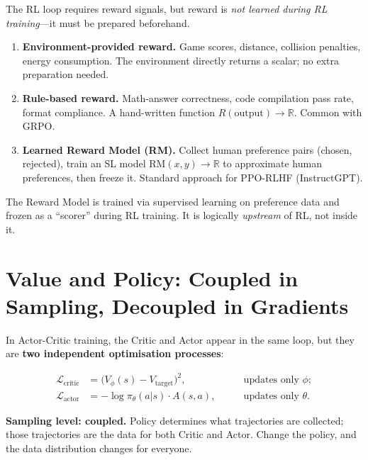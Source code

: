 The RL loop requires reward signals, but reward is \emph{not learned during RL training}---it must be prepared beforehand.

\begin{enumerate}
  \item \textbf{Environment-provided reward.}
    Game scores, distance, collision penalties, energy consumption.
    The environment directly returns a scalar; no extra preparation needed.

  \item \textbf{Rule-based reward.}
    Math-answer correctness, code compilation pass rate, format compliance.
    A hand-written function $R(\text{output})\to\mathbb{R}$.
    Common with GRPO.

  \item \textbf{Learned Reward Model (RM).}
    Collect human preference pairs (chosen, rejected), train an SL model
    $\text{RM}(x,y)\to\mathbb{R}$ to approximate human preferences, then freeze it.
    Standard approach for PPO-RLHF (InstructGPT).
\end{enumerate}

\begin{keyidea}
The Reward Model is trained via supervised learning on preference data and frozen as a ``scorer'' during RL training.
It is logically \emph{upstream} of RL, not inside it.
\end{keyidea}

\section{Value and Policy: Coupled in Sampling, Decoupled in Gradients}
\label{sec:coupled-decoupled}

In Actor-Critic training, the Critic and Actor appear in the same loop, but they are \textbf{two independent optimisation processes}:

\[
\begin{aligned}
  \mathcal{L}_{\text{critic}} &= \bigl(V_\phi(s) - V_{\text{target}}\bigr)^2,
  \qquad &\text{updates only } \phi; \\
  \mathcal{L}_{\text{actor}}  &= -\log\pi_\theta(a|s)\cdot A(s,a),
  \qquad &\text{updates only } \theta.
\end{aligned}
\]

\textbf{Sampling level: coupled.}
Policy determines what trajectories are collected; those trajectories are the data for both Critic and Actor.
Change the policy, and the data distribution changes for everyone.

